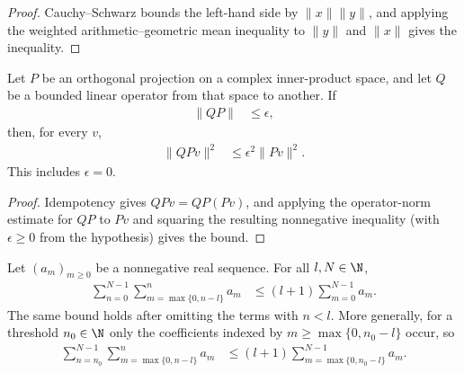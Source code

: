 \begin{proof}
    \leanok
    Cauchy--Schwarz bounds the left-hand side by
    $\lVert x\rVert\lVert y\rVert$, and applying the weighted
    arithmetic--geometric mean inequality to $\lVert y\rVert$ and
    $\lVert x\rVert$ gives the inequality.
\end{proof}

\begin{lemma}
    \label{lem:nachtergaele_c3_projection_composition}
    \leanok
    Let $P$ be an orthogonal projection on a complex inner-product space, and let
    $Q$ be a bounded linear operator from that space to another. If
    \begin{align}
        \lVert QP\rVert & \leq \epsilon,
    \end{align}
    then, for every $v$,
    \begin{align}
        \lVert QPv\rVert^2
         & \leq \epsilon^2\lVert Pv\rVert^2.
        \label{eq:nachtergaele_c3_projection_composition}
    \end{align}
    This includes $\epsilon=0$.
\end{lemma}

\begin{proof}
    \leanok
    Idempotency gives $QPv=QP(Pv)$, and applying the operator-norm estimate
    for $QP$ to $Pv$ and squaring the resulting nonnegative inequality (with
    $\epsilon\geq0$ from the hypothesis) gives the bound.
\end{proof}

\begin{lemma}
    \label{thm:moving_window_sum_le}
    \leanok
    Let $(a_m)_{m\geq0}$ be a nonnegative real sequence. For all $l,N\in\N$,
    \begin{align}
        \sum_{n=0}^{N-1}\sum_{m=\max\{0,n-l\}}^{n}a_m
         & \leq (l+1)\sum_{m=0}^{N-1}a_m.
        \label{eq:moving_window_sum_le}
    \end{align}
    The same bound holds after omitting the terms with $n<l$. More generally,
    for a threshold $n_0\in\N$ only the coefficients indexed by
    $m\geq\max\{0,n_0-l\}$ occur, so
    \begin{align}
        \sum_{n=n_0}^{N-1}\sum_{m=\max\{0,n-l\}}^{n}a_m
         & \leq (l+1)\sum_{m=\max\{0,n_0-l\}}^{N-1}a_m.
        \label{eq:moving_window_sum_Ico_le}
    \end{align}
\end{lemma}


